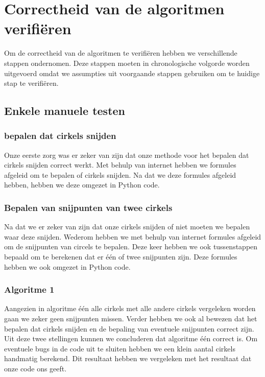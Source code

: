 \documentclass[11pt,a4paper]{article}
\begin{document}
\section{Correctheid van de algoritmen verifi\"eren}

Om de correctheid van de algoritmen te verifi\"eren hebben we verschillende stappen ondernomen. Deze stappen moeten in chronologische volgorde worden uitgevoerd omdat we assumpties uit voorgaande stappen gebruiken om te huidige stap te verifi\"eren.

\subsection{Enkele manuele testen}

\subsubsection*{bepalen dat cirkels snijden}
Onze eerste zorg was er zeker van zijn dat onze methode voor het bepalen dat cirkels snijden correct werkt. Met behulp van internet hebben we formules afgeleid om te bepalen of cirkels snijden. Na dat we deze formules afgeleid hebben, hebben we deze omgezet in Python code.

\subsubsection*{Bepalen van snijpunten van twee cirkels}
Na dat we er zeker van zijn dat onze cirkels snijden of niet moeten we bepalen waar deze snijden. Wederom hebben we met behulp van internet formules afgeleid om de snijpunten van circels te bepalen. Deze keer hebben we ook tussenstappen bepaald om te berekenen dat er \'e\'en of twee snijpunten zijn. Deze formules hebben we ook omgezet in Python code.

\subsubsection*{Algoritme 1}

Aangezien in algoritme \'e\'en alle cirkels met alle andere cirkels vergeleken worden gaan we zeker geen snijpunten missen. Verder hebben we ook al bewezen dat het bepalen dat cirkels snijden en de bepaling van eventuele snijpunten correct zijn. Uit deze twee stellingen kunnen we concluderen dat algoritme \'e\'en correct is.
Om eventuele bugs in de code uit te sluiten hebben we een klein aantal cirkels handmatig berekend. Dit resultaat hebben we vergeleken met het resultaat dat onze code ons geeft.
\end{document}
